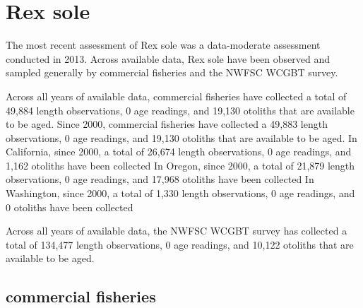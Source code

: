 \documentclass[11pt,
  english,
  letterpaper,
]{article}
\begin{document}

\hypertarget{rex-sole}{%
\section{Rex sole}\label{rex-sole}}

\leavevmode\tagmcend\tagstructend


The most recent assessment of Rex sole was a data-moderate assessment conducted in 2013. Across available data, Rex sole have been observed and sampled generally by commercial fisheries and the NWFSC WCGBT survey.

\leavevmode\tagmcend\tagstructend\par


Across all years of available data, commercial fisheries have collected a total of 49,884 length observations, 0 age readings, and 19,130 otoliths that are available to be aged. Since 2000, commercial fisheries have collected a 49,883 length observations, 0 age readings, and 19,130 otoliths that are available to be aged. In California, since 2000, a total of 26,674 length observations, 0 age readings, and 1,162 otoliths have been collected In Oregon, since 2000, a total of 21,879 length observations, 0 age readings, and 17,968 otoliths have been collected In Washington, since 2000, a total of 1,330 length observations, 0 age readings, and 0 otoliths have been collected

\leavevmode\tagmcend\tagstructend\par


Across all years of available data, the NWFSC WCGBT survey has collected a total of 134,477 length observations, 0 age readings, and 10,122 otoliths that are available to be aged.

\leavevmode\tagmcend\tagstructend\par


\hypertarget{commercial-fisheries-39}{%
\subsection{commercial fisheries}\label{commercial-fisheries-39}}
\end{document}
